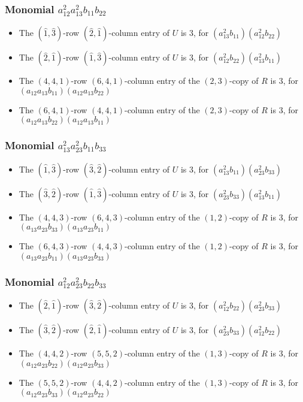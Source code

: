 \documentclass{article}
\begin{document}
\subsubsection{Monomial $ a_{12}^{2} a_{13}^{2} b_{11} b_{22} $}

\begin{itemize}
\item The $(\hat{1}, \hat{3})$-row $(\hat{2}, \hat{1})$-column entry of $U$ is $3$, for $( a_{13}^{2} b_{11} )( a_{12}^{2} b_{22} )$ 
\item The $(\hat{2}, \hat{1})$-row $(\hat{1}, \hat{3})$-column entry of $U$ is $3$, for $( a_{12}^{2} b_{22} )( a_{13}^{2} b_{11} )$ 
\item The $(4, 4, 1)$-row $(6, 4, 1)$-column entry of the $ \left(2, 3\right) $-copy of $R$ is $ 3 $, for $( a_{12} a_{13} b_{11} )( a_{12} a_{13} b_{22} )$ 
\item The $(6, 4, 1)$-row $(4, 4, 1)$-column entry of the $ \left(2, 3\right) $-copy of $R$ is $ 3 $, for $( a_{12} a_{13} b_{22} )( a_{12} a_{13} b_{11} )$ 
\end{itemize}
\subsubsection{Monomial $ a_{13}^{2} a_{23}^{2} b_{11} b_{33} $}

\begin{itemize}
\item The $(\hat{1}, \hat{3})$-row $(\hat{3}, \hat{2})$-column entry of $U$ is $3$, for $( a_{13}^{2} b_{11} )( a_{23}^{2} b_{33} )$ 
\item The $(\hat{3}, \hat{2})$-row $(\hat{1}, \hat{3})$-column entry of $U$ is $3$, for $( a_{23}^{2} b_{33} )( a_{13}^{2} b_{11} )$ 
\item The $(4, 4, 3)$-row $(6, 4, 3)$-column entry of the $ \left(1, 2\right) $-copy of $R$ is $ 3 $, for $( a_{13} a_{23} b_{33} )( a_{13} a_{23} b_{11} )$ 
\item The $(6, 4, 3)$-row $(4, 4, 3)$-column entry of the $ \left(1, 2\right) $-copy of $R$ is $ 3 $, for $( a_{13} a_{23} b_{11} )( a_{13} a_{23} b_{33} )$ 
\end{itemize}
\subsubsection{Monomial $ a_{12}^{2} a_{23}^{2} b_{22} b_{33} $}

\begin{itemize}
\item The $(\hat{2}, \hat{1})$-row $(\hat{3}, \hat{2})$-column entry of $U$ is $3$, for $( a_{12}^{2} b_{22} )( a_{23}^{2} b_{33} )$ 
\item The $(\hat{3}, \hat{2})$-row $(\hat{2}, \hat{1})$-column entry of $U$ is $3$, for $( a_{23}^{2} b_{33} )( a_{12}^{2} b_{22} )$ 
\item The $(4, 4, 2)$-row $(5, 5, 2)$-column entry of the $ \left(1, 3\right) $-copy of $R$ is $ 3 $, for $( a_{12} a_{23} b_{22} )( a_{12} a_{23} b_{33} )$ 
\item The $(5, 5, 2)$-row $(4, 4, 2)$-column entry of the $ \left(1, 3\right) $-copy of $R$ is $ 3 $, for $( a_{12} a_{23} b_{33} )( a_{12} a_{23} b_{22} )$ 
\end{itemize}
\end{document}
